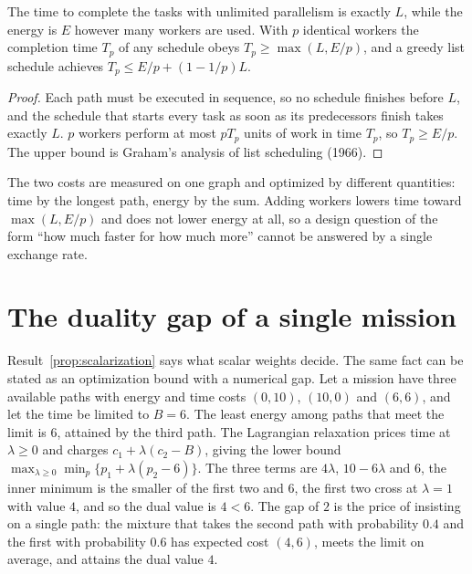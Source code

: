 \begin{newresult}\label{prop:time-energy}
The time to complete the tasks with unlimited parallelism is exactly $L$, while the energy is $E$ however many workers are used. With $p$ identical workers the completion time $T_p$ of any schedule obeys $T_p\ge\max(L,E/p)$, and a greedy list schedule achieves $T_p\le E/p+(1-1/p)L$.
\end{newresult}
\begin{proof}
Each path must be executed in sequence, so no schedule finishes before $L$, and the schedule that starts every task as soon as its predecessors finish takes exactly $L$. $p$ workers perform at most $pT_p$ units of work in time $T_p$, so $T_p\ge E/p$. The upper bound is Graham's analysis of list scheduling (1966).
\end{proof}

The two costs are measured on one graph and optimized by different quantities: time by the longest path, energy by the sum. Adding workers lowers time toward $\max(L,E/p)$ and does not lower energy at all, so a design question of the form ``how much faster for how much more'' cannot be answered by a single exchange rate.


\section{The duality gap of a single mission}\label{sec:gap-mission}

Result~\ref{prop:scalarization} says what scalar weights decide. The same fact can be stated as an optimization bound with a numerical gap. Let a mission have three available paths with energy and time costs $(0,10)$, $(10,0)$ and $(6,6)$, and let the time be limited to $B=6$. The least energy among paths that meet the limit is $6$, attained by the third path. The Lagrangian relaxation prices time at $\lambda\ge0$ and charges $c_1+\lambda(c_2-B)$, giving the lower bound $\max_{\lambda\ge0}\min_p\{p_1+\lambda(p_2-6)\}$. The three terms are $4\lambda$, $10-6\lambda$ and $6$, the inner minimum is the smaller of the first two and $6$, the first two cross at $\lambda=1$ with value $4$, and so the dual value is $4<6$. The gap of $2$ is the price of insisting on a single path: the mixture that takes the second path with probability $0.4$ and the first with probability $0.6$ has expected cost $(4,6)$, meets the limit on average, and attains the dual value $4$.

